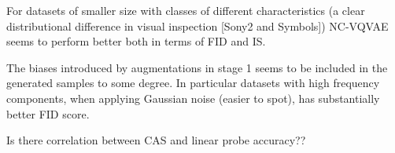 \documentclass[../../thesis.tex]{subfiles}
\begin{document}
For datasets of smaller size with classes of different characteristics (a clear distributional difference in visual inspection [Sony2 and Symbols]) NC-VQVAE seems to perform better both in terms of FID and IS. \newline

The biases introduced by augmentations in stage 1 seems to be included in the generated samples to some degree. In particular datasets with high frequency components, when applying Gaussian noise (easier to spot), has substantially better FID score.  \newline

Is there correlation between CAS and linear probe accuracy?? \newline




\end{document}
